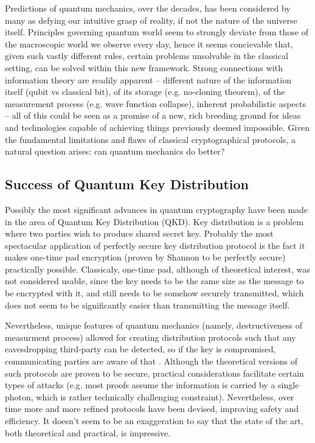 \documentclass[10pt]{article}
\begin{document}
Predictions of quantum mechanics, over the decades, has been considered by many as defying our intuitive
grasp of reality, if not the nature of the universe itself. Principles governing quantum world seem to
strongly deviate from those of the macroscopic world we observe every day, hence it seems concievable
that, given such vastly different rules, certain problems unsolvable in the classical setting, can be
solved within this new framework. Strong connections with information theory are readily apparent -- 
different nature of the information itself (qubit vs classical bit), of its storage (e.g. no-cloning 
theorem), of the measurement process (e.g. wave function collapse), inherent probabilistic aspects --
all of this could be seen as a promise of a new, rich breeding ground for ideas and technologies
capable of achieving things previously deemed impossible. Given the fundamental limitations and flaws
of classical cryptographical protocols, a natural question arises: can quantum mechanics do better?

\subsection*{Success of Quantum Key Distribution}

Possibly the most significant advances in quantum cryptography have been made in the area of Quantum
Key Distribution (QKD). Key distribution is a problem where two parties wish to produce shared secret
key. Probably the most spectacular application of perfectly secure key distribution protocol is the
fact it makes one-time pad encryption (proven by Shannon to be perfectly secure) practically possible.
Classicaly, one-time pad, although of theoretical interest, was not considered usable, since the
key needs to be the same size as the message to be encrypted with it, and still needs to be somehow 
securely transmitted, which does not seem to be significantly easier than transmitting the message
itself.

Nevertheless, unique features of quantum mechanics (namely, destructiveness of measurment process)
allowed  for creating distribution protocols such that any eavesdropping third-party can be detected,
so if the key is compromised, communicating parties are aware of that \cite{bb84}. Although the
theoretical versions of such protocols are proven to be secure, practical considerations facilitate
certain types of attacks (e.g. most proofs assume the information is carried by a single photon,
which is rather technically challenging constraint). Nevertheless, over time more and more refined
protocols have been devised, improving safety and efficiency. It doesn't seem to be an exaggeration 
to say that the state of the art, both theoretical and practical, is impressive.
\end{document}
